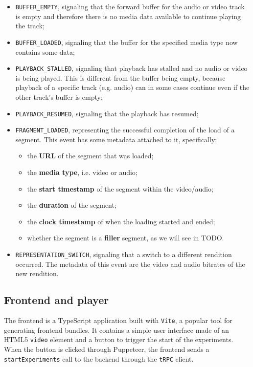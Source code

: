 \begin{itemize}
    \item \texttt{BUFFER\_EMPTY}, signaling that the forward buffer for the audio or video track is empty and therefore there is no media data available to continue playing the track;
    \item \texttt{BUFFER\_LOADED}, signaling that the buffer for the specified media type now contains some data;
    \item \texttt{PLAYBACK\_STALLED}, signaling that playback has stalled and no audio or video is being played. This is different from the buffer being empty, because playback of a specific track (e.g. audio) can in some cases continue even if the other track's buffer is empty;
    \item \texttt{PLAYBACK\_RESUMED}, signaling that the playback has resumed;
    \item \texttt{FRAGMENT\_LOADED}, representing the successful completion of the load of a segment. This event has some metadata attached to it, specifically:
        \begin{itemize}
            \item the \textbf{URL} of the segment that was loaded;
            \item the \textbf{media type}, i.e. video or audio;
            \item the \textbf{start timestamp} of the segment within the video/audio;
            \item the \textbf{duration} of the segment;
            \item the \textbf{clock timestamp} of when the loading started and ended;
            \item whether the segment is a \textbf{filler} segment, as we will see in TODO.
        \end{itemize}
    \item \texttt{REPRESENTATION\_SWITCH}, signaling that a switch to a different rendition occurred. The metadata of this event are the video and audio bitrates of the new rendition.
\end{itemize}

\subsection{Frontend and player}
\label{sec:eval/testbed/frontend}

The frontend is a TypeScript application built with \texttt{Vite}, a popular tool for generating frontend bundles. It contains a simple user interface made of an HTML5 \texttt{video} element and a button to trigger the start of the experiments. When the button is clicked through Puppeteer, the frontend sends a \texttt{startExperiments} call to the backend through the \texttt{tRPC} client.

